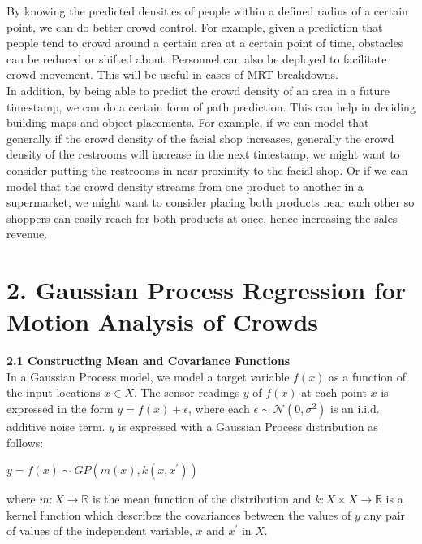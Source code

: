 \documentclass[letterpaper]{article}
\begin{document}
By knowing the predicted densities of people within a defined radius of a certain point, we can do better crowd control. For example, given a prediction that people tend to crowd around a certain area at a certain point of time, obstacles can be reduced or shifted about. Personnel can also be deployed to facilitate crowd movement. This will be useful in cases of MRT breakdowns. \\

In addition, by being able to predict the crowd density of an area in a future timestamp, we can do a certain form of path prediction. This can help in deciding building maps and object placements. For example, if we can model that generally if the crowd density of the facial shop increases, generally the crowd density of the restrooms will increase in the next timestamp, we might want to consider putting the restrooms in near proximity to the facial shop. Or if we can model that the crowd density streams from one product to another in a supermarket, we might want to consider placing both products near each other so shoppers can easily reach for both products at once, hence increasing the sales revenue. \\

\section{2.  Gaussian Process Regression for Motion Analysis of Crowds}

{\bf2.1  Constructing Mean and Covariance Functions} \\

In a Gaussian Process model, we model a target variable $f(x)$ as a function of the input locations $x \in X$. The sensor readings $y$ of $f(x)$ at each point $x$ is expressed in the form $y = f(x) + \epsilon$, where each $\epsilon \sim \mathcal{N}(0, \sigma^2)$ is an i.i.d. additive noise term. $y$ is expressed with a Gaussian Process distribution as follows:

\begin{center}
$y = f(x) \sim GP(m(x), k(x,x^\prime))$
\end{center}

where $m: X \rightarrow \mathbb{R}$ is the mean function of the distribution and $k: X \times X \rightarrow \mathbb{R}$ is a kernel function which describes the covariances between the values of $y$ any pair of values of the independent variable, $x$ and $x^\prime$ in $X$. \\
\end{document}
